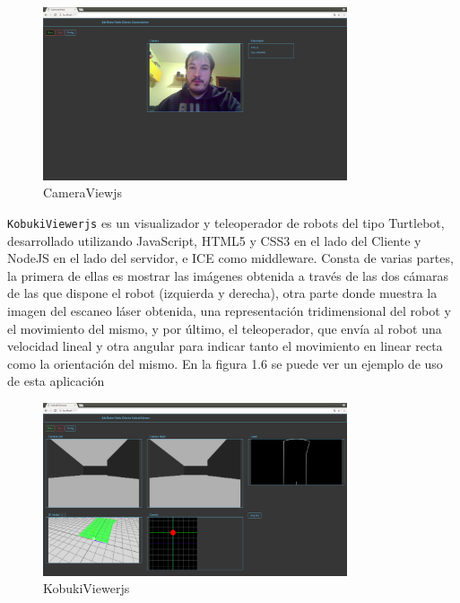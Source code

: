 \begin{figure}[H]
  \begin{center}
    \includegraphics[width=0.8\textwidth]{figures/cameraviewjs.png}
		\caption{CameraViewjs}
		\label{fig.cameraviewjs}
		\end{center}
\end{figure}


\texttt{KobukiViewerjs} es un visualizador y teleoperador de robots del tipo Turtlebot, desarrollado utilizando JavaScript, HTML5 y CSS3 en el lado del Cliente y NodeJS en el lado del servidor, e ICE como middleware. Consta de varias partes, la primera de ellas es mostrar las imágenes obtenida a través de las dos cámaras de las que dispone el robot (izquierda y derecha), otra parte donde muestra la imagen del escaneo láser obtenida, una representación tridimensional del robot y el movimiento del mismo, y por último, el teleoperador, que envía al robot una velocidad lineal y otra angular para indicar tanto el movimiento en linear recta como la orientación del mismo. En la figura 1.6 se puede ver un ejemplo de uso de esta aplicación

\begin{figure}[H]
  \begin{center}
    \includegraphics[width=0.8\textwidth]{figures/kobukiviewerjs.png}
		\caption{KobukiViewerjs}
		\label{fig.kobukiviewerjs}
		\end{center}
\end{figure}

